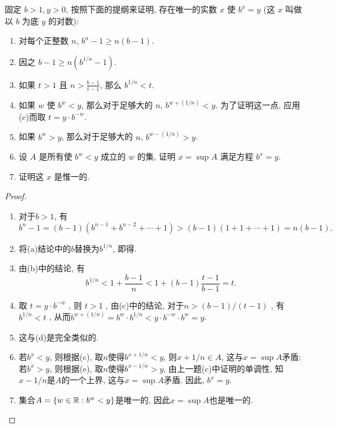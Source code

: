\documentclass{article}
\begin{document}
\begin{problem}[1-7]
固定 \(b > 1, y > 0\), 按照下面的提纲来证明, 存在唯一的实数 \(x\) 使 \(b^x = y\)  
(这 \(x\) 叫做以 \(b\) 为底 \(y\) 的对数):
\begin{enumerate}[label=(\alph*)]
\item 对每个正整数 \(n\), \(b^n - 1 \geq n(b - 1)\). 

\item 因之 \(b - 1 \geq n(b^{1/n} - 1)\). 

\item 如果 \(t > 1\) 且 \(n > \frac{b-1}{t-1}\), 那么 \(b^{1/n} < t\). 

\item 如果 \(w\) 使 \(b^w < y\), 那么对于足够大的 \(n\), \(b^{w + (1/n)} < y\). 为了证明这一点, 应用(c)而取 \(t = y \cdot b^{-w}\). 

\item 如果 \(b^w > y\), 那么对于足够大的 \(n\), \(b^{w - (1/n)} > y\). 

\item 设 \(A\) 是所有使 \(b^w < y\) 成立的 \(w\) 的集, 证明 \(x = \sup A\) 满足方程 \(b^x = y\). 

\item 证明这 \(x\) 是惟一的. 
\end{enumerate}
\end{problem}

\begin{proof}
\begin{enumerate}[label=(\alph*)]
\item 对于$ b>1 $, 有
\[ b^n-1=(b-1)(b^{n-1}+b^{n-2}+\cdots+1)>(b-1)(1+1+\cdots+1)=n(b-1). \]
\item 将(a)结论中的$ b $替换为$ b^{1/n} $, 即得.
\item 由(b)中的结论, 有
 \[ b^{1/n}<1+\frac{b-1}{n}<1+(b-1)\frac{t-1}{b-1}=t. \] 
\item 取 $ t=y\cdot b^{-w} $ , 则 $ t>1 $ , 由(c)中的结论, 对于$ n>(b-1)/(t-1) $ , 有 $ b^{1/n}<t $ , 从而$ b^{w+(1/n)}=b^w\cdot b^{1/n}<y\cdot b^{-w}\cdot b^w=y $.
\item 这与(d)是完全类似的.
\item 若$ b^x<y $, 则根据(c), 取$ n $使得$ b^{x+1/n}<y $, 则$ x+1/n\in A $, 这与$ x=\sup A $矛盾; 若$ b^x>y $, 则根据(e), 取$ n $使得$ b^{x-1/n}>y $, 由上一题(c)中证明的单调性, 知$ x-1/n $是$ A $的一个上界, 这与$ x=\sup A $矛盾. 因此, $ b^x=y $.
\item 集合$ A=\{w\in\mathbb{R}: b^w<y\} $是唯一的, 因此$ x=\sup A $也是唯一的.
\end{enumerate}
\end{proof}
\end{document}
